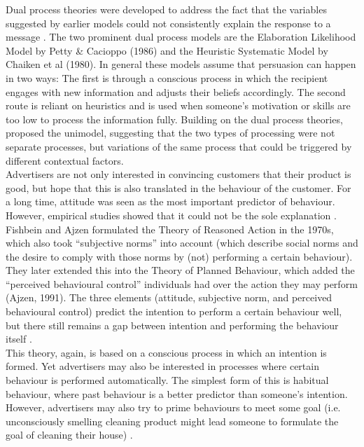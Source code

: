 \documentclass[10pt,a4paper]{article}
\begin{document}
Dual process theories were developed to address the fact that the variables suggested by earlier models could not consistently explain the response to a message \cite{Xu2017}. The two prominent dual process models are the Elaboration Likelihood Model by Petty \& Cacioppo (1986) and the Heuristic Systematic Model by Chaiken et al (1980). In general these models assume that persuasion can happen in two ways: The first is through a conscious process in which the recipient engages with new information and adjusts their beliefs accordingly. The second route is reliant on heuristics and is used when someone’s motivation or skills are too low to process the information fully. Building on the dual process theories, \cite{Kruglanski1999} proposed the unimodel, suggesting that the two types of processing were not separate  processes, but variations of the same process that could be triggered by different contextual factors. \\

Advertisers are not only interested in convincing customers that their product is good, but hope that this is also translated in the behaviour of the customer. For a long time, attitude was seen as the most important predictor of behaviour. However, empirical studies showed that it could not be the sole explanation \citep{Fennis2015}. Fishbein and Ajzen formulated the Theory of Reasoned Action in the 1970s, which also took “subjective norms” into account (which describe social norms and the desire to comply with those norms by (not) performing a certain behaviour). They later extended this into the Theory of Planned Behaviour, which added the “perceived behavioural control” individuals had over the action they may perform (Ajzen, 1991). The three elements (attitude, subjective norm, and perceived behavioural control) predict the intention to perform a certain behaviour well, but there still remains a gap between intention and performing the behaviour itself \citep{Fennis2015}. \\

This theory, again, is based on a conscious process in which an intention is formed. Yet advertisers may also be interested in processes where certain behaviour is performed automatically.  The simplest form of this is habitual behaviour, where past behaviour is a better predictor than someone’s intention. However, advertisers may also try to prime behaviours to meet some goal (i.e. unconsciously smelling cleaning product might lead someone to formulate the goal of cleaning their house) \citep{Fennis2015}.  
\end{document}
